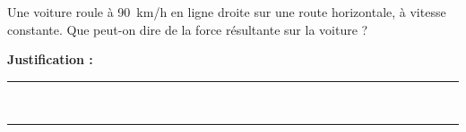 Une voiture roule à \qty{90}{km/h} en ligne droite sur une route horizontale, à vitesse constante. Que peut-on dire de la force résultante sur la voiture ?

\choices

\noindent\textbf{Justification :} \hrulefill \\[2.5ex]
\rule{\linewidth}{0.4pt} \\[2.5ex]
\rule{\linewidth}{0.4pt}
\vfill
